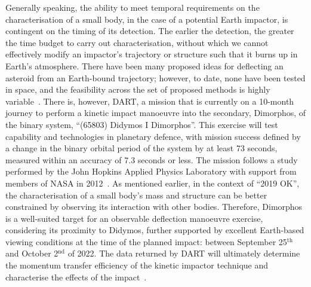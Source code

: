 Generally speaking, the ability to meet temporal requirements on the characterisation of a small body, in the case of a potential Earth impactor, is contingent on the timing of its detection. The earlier the detection, the greater the time budget to carry out characterisation, without which we cannot effectively modify an impactor's trajectory or structure such that it burns up in Earth's atmosphere. There have been many proposed ideas for deflecting an asteroid from an Earth-bound trajectory; however, to date, none have been tested in space, and the feasibility across the set of proposed methods is highly variable~\cite{Harris2015}. There is, however,  \gls{DART}, a mission that is currently on a 10-month journey to perform a kinetic impact manoeuvre into the secondary, Dimorphos, of the binary system, ``(65803) Didymos I Dimorphos''. This exercise will test  capability and technologies in planetary defence, with mission success defined by a change in the binary orbital period of the system by at least 73 seconds, measured within an accuracy of 7.3 seconds or less. The mission follows a study performed by the John Hopkins Applied Physics Laboratory with support from members of \gls{NASA} in 2012~\cite{Cheng2012}. As mentioned earlier, in the context of ``2019 OK'', the characterisation of a small body's mass and structure can be better constrained by observing its interaction with other bodies. Therefore, Dimorphos is a well-suited target for an observable deflection manoeuvre exercise, considering its proximity to Didymos, further supported by excellent Earth-based viewing conditions at the time of the planned impact: between September 25$^{\text{th}}$ and October 2$^{\text{nd}}$ of 2022. The data returned by \gls{DART} will ultimately determine the momentum transfer efficiency of the kinetic impactor technique and characterise the effects of the impact~\cite{Cheng2012, Rivkin2021}.

